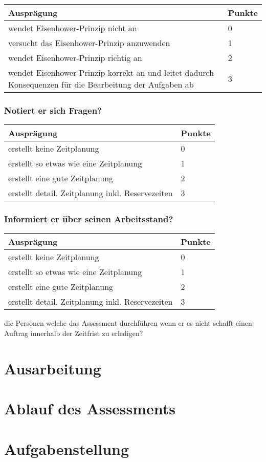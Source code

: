 \begin{center}
  \begin{tabular}{ | p{7cm} | p{1cm} |}
   \hline
   \textbf{Ausprägung} & \textbf{Punkte} \\ \hline
   wendet Eisenhower-Prinzip nicht an & 0 \\ \hline
   versucht das Eisenhower-Prinzip anzuwenden & 1 \\ \hline
   wendet Eisenhower-Prinzip richtig an & 2 \\ \hline
   wendet Eisenhower-Prinzip korrekt an und leitet dadurch Konsequenzen für die Bearbeitung der Aufgaben ab  & 3\\ \hline
  \end{tabular}
\end{center}

\subsubsection{Notiert er sich Fragen?}

\begin{center}
  \begin{tabular}{ | p{7cm} | p{1cm} |}
   \hline
   \textbf{Ausprägung} & \textbf{Punkte} \\ \hline
   erstellt keine Zeitplanung & 0 \\ \hline
   erstellt so etwas wie eine Zeitplanung & 1 \\ \hline
   erstellt eine gute Zeitplanung & 2 \\ \hline
   erstellt detail. Zeitplanung inkl. Reservezeiten  & 3\\ \hline
  \end{tabular}
\end{center}

\subsubsection{Informiert er über seinen Arbeitsstand?}

\begin{center}
  \begin{tabular}{ | p{7cm} | p{1cm} |}
   \hline
   \textbf{Ausprägung} & \textbf{Punkte} \\ \hline
   erstellt keine Zeitplanung & 0 \\ \hline
   erstellt so etwas wie eine Zeitplanung & 1 \\ \hline
   erstellt eine gute Zeitplanung & 2 \\ \hline
   erstellt detail. Zeitplanung inkl. Reservezeiten  & 3\\ \hline
  \end{tabular}
\end{center}

die Personen welche das Assessment durchführen wenn er es nicht schafft einen Auftrag innerhalb der Zeitfrist zu erledigen?

\section{Ausarbeitung}

\section{Ablauf des Assessments}

\section{Aufgabenstellung}